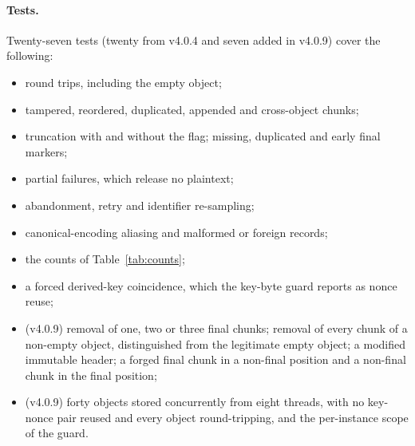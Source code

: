\documentclass[pdflatex,sn-mathphys-num,twocolumn]{sn-jnl}
\theoremstyle{plain}
\theoremstyle{definition}
\begin{document}
\paragraph{Tests.}
Twenty-seven tests (twenty from v4.0.4 and seven added in v4.0.9) cover the following:
\begin{itemize}
\item round trips, including the empty object;
\item tampered, reordered, duplicated, appended and cross-object chunks;
\item truncation with and without the flag; missing, duplicated and early final markers;
\item partial failures, which release no plaintext;
\item abandonment, retry and identifier re-sampling;
\item canonical-encoding aliasing and malformed or foreign records;
\item the counts of Table~\ref{tab:counts};
\item a forced derived-key coincidence, which the key-byte guard reports as nonce reuse;
\item (v4.0.9) removal of one, two or three final chunks; removal of every chunk of a non-empty object, distinguished from the legitimate empty object; a modified immutable header; a forged final chunk in a non-final position and a non-final chunk in the final position;
\item (v4.0.9) forty objects stored concurrently from eight threads, with no key-nonce pair reused and every object round-tripping, and the per-instance scope of the guard.
\end{itemize}
\end{document}
